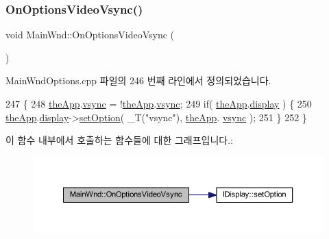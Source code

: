 \subsubsection{\texorpdfstring{On\+Options\+Video\+Vsync()}{OnOptionsVideoVsync()}}
{\footnotesize\ttfamily void Main\+Wnd\+::\+On\+Options\+Video\+Vsync (\begin{DoxyParamCaption}{ }\end{DoxyParamCaption})\hspace{0.3cm}{\ttfamily [protected]}}



Main\+Wnd\+Options.\+cpp 파일의 246 번째 라인에서 정의되었습니다.


\begin{DoxyCode}
247 \{
248     \mbox{\hyperlink{_v_b_a_8cpp_a8095a9d06b37a7efe3723f3218ad8fb3}{theApp}}.\mbox{\hyperlink{class_v_b_a_a84075b77df64f3dc2100159064b79fba}{vsync}} = !\mbox{\hyperlink{_v_b_a_8cpp_a8095a9d06b37a7efe3723f3218ad8fb3}{theApp}}.\mbox{\hyperlink{class_v_b_a_a84075b77df64f3dc2100159064b79fba}{vsync}};
249     \textcolor{keywordflow}{if}( \mbox{\hyperlink{_v_b_a_8cpp_a8095a9d06b37a7efe3723f3218ad8fb3}{theApp}}.\mbox{\hyperlink{class_v_b_a_a940e5bad8b3ed2436888dbcd03bfd563}{display}} ) \{
250         \mbox{\hyperlink{_v_b_a_8cpp_a8095a9d06b37a7efe3723f3218ad8fb3}{theApp}}.\mbox{\hyperlink{class_v_b_a_a940e5bad8b3ed2436888dbcd03bfd563}{display}}->\mbox{\hyperlink{class_i_display_a1766244708c252bb8781892c76c20ba9}{setOption}}( \_T(\textcolor{stringliteral}{"vsync"}), \mbox{\hyperlink{_v_b_a_8cpp_a8095a9d06b37a7efe3723f3218ad8fb3}{theApp}}.
      \mbox{\hyperlink{class_v_b_a_a84075b77df64f3dc2100159064b79fba}{vsync}} );
251     \}
252 \}
\end{DoxyCode}
이 함수 내부에서 호출하는 함수들에 대한 그래프입니다.\+:
\nopagebreak
\begin{figure}[H]
\begin{center}
\leavevmode
\includegraphics[width=350pt]{class_main_wnd_ad539bc63bc7704f4aa66e3a75a39826b_cgraph}
\end{center}
\end{figure}
\mbox{\label{class_main_wnd_a3db1b6ad5af63ac2c3476868c015f6aa}} 
